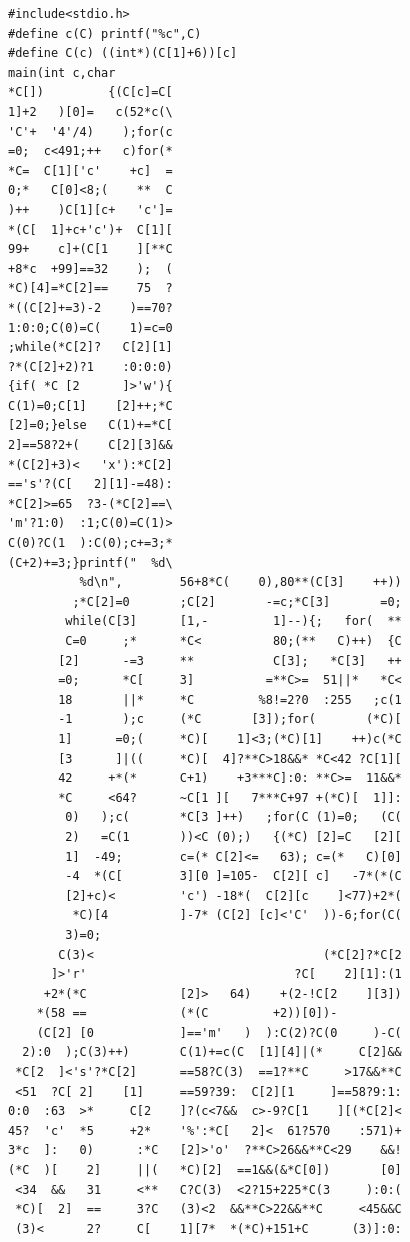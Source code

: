 \documentclass[11pt]{article}
\begin{document}
\begin{lstlisting}
#include<stdio.h>
#define c(C) printf("%c",C)
#define C(c) ((int*)(C[1]+6))[c]
main(int c,char
*C[])         {(C[c]=C[
1]+2   )[0]=   c(52*c(\
'C'+  '4'/4)    );for(c
=0;  c<491;++   c)for(*
*C=  C[1]['c'    +c]  =
0;*   C[0]<8;(    **  C
)++    )C[1][c+   'c']=
*(C[  1]+c+'c')+  C[1][
99+    c]+(C[1    ][**C
+8*c  +99]==32    );  (
*C)[4]=*C[2]==    75  ?
*((C[2]+=3)-2    )==70?
1:0:0;C(0)=C(    1)=c=0
;while(*C[2]?   C[2][1]
?*(C[2]+2)?1    :0:0:0)
{if( *C [2      ]>'w'){
C(1)=0;C[1]    [2]++;*C
[2]=0;}else   C(1)+=*C[
2]==58?2+(    C[2][3]&&
*(C[2]+3)<   'x'):*C[2]
=='s'?(C[   2][1]-=48):
*C[2]>=65  ?3-(*C[2]==\
'm'?1:0)  :1;C(0)=C(1)>
C(0)?C(1  ):C(0);c+=3;*
(C+2)+=3;}printf("  %d\
          %d\n",        56+8*C(    0),80**(C[3]    ++))
         ;*C[2]=0       ;C[2]       -=c;*C[3]       =0;
        while(C[3]      [1,-         1]--){;   for(  **
        C=0     ;*      *C<          80;(**   C)++)  {C
       [2]      -=3     **           C[3];   *C[3]   ++
       =0;      *C[     3]          =**C>=  51||*   *C<
       18       ||*     *C         %8!=2?0  :255   ;c(1
       -1       );c     (*C       [3]);for(       (*C)[
       1]      =0;(     *C)[    1]<3;(*C)[1]    ++)c(*C
       [3      ]|((     *C)[  4]?**C>18&&* *C<42 ?C[1][
       42     +*(*      C+1)    +3***C]:0: **C>=  11&&*
       *C     <64?      ~C[1 ][   7***C+97 +(*C)[  1]]:
        0)   );c(       *C[3 ]++)   ;for(C (1)=0;   (C(
        2)   =C(1       ))<C (0);)   {(*C) [2]=C   [2][
        1]  -49;        c=(* C[2]<=   63); c=(*   C)[0]
        -4  *(C[        3][0 ]=105-  C[2][ c]   -7*(*(C
        [2]+c)<         'c') -18*(  C[2][c    ]<77)+2*(
         *C)[4          ]-7* (C[2] [c]<'C'  ))-6;for(C(
        3)=0;
       C(3)<                                (*C[2]?*C[2
      ]>'r'                             ?C[    2][1]:(1
     +2*(*C             [2]>   64)    +(2-!C[2    ][3])
    *(58 ==             (*(C         +2))[0])-
    (C[2] [0            ]=='m'   )  ):C(2)?C(0     )-C(
  2):0  );C(3)++)       C(1)+=c(C  [1][4]|(*     C[2]&&
 *C[2  ]<'s'?*C[2]      ==58?C(3)  ==1?**C     >17&&**C
 <51  ?C[ 2]    [1]     ==59?39:  C[2][1     ]==58?9:1:
0:0  :63  >*     C[2    ]?(c<7&&  c>-9?C[1    ][(*C[2]<
45?  'c'  *5     +2*    '%':*C[   2]<  61?570    :571)+
3*c  ]:   0)      :*C   [2]>'o'  ?**C>26&&**C<29    &&!
(*C  )[    2]     ||(   *C)[2]  ==1&&(&*C[0])       [0]
 <34  &&   31     <**   C?C(3)  <2?15+225*C(3     ):0:(
 *C)[  2]  ==     3?C   (3)<2  &&**C>22&&**C     <45&&C
 (3)<      2?     C[    1][7*  *(*C)+151+C      (3)]:0:

\end{lstlisting}
\end{document}

